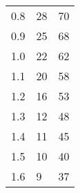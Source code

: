 \begin{table}[H]
{\begin{tabular}{|l|l|l|}
0.8                      & 28                                                                                                                  & 70                                                                                                                 \\
0.9                      & 25                                                                                                                  & 68                                                                                                                 \\
1.0                      & 22                                                                                                                  & 62                                                                                                                 \\
1.1                      & 20                                                                                                                  & 58                                                                                                                 \\
1.2                      & 16                                                                                                                  & 53                                                                                                                 \\
1.3                      & 12                                                                                                                  & 48                                                                                                                 \\
1.4                      & 11                                                                                                                  & 45                                                                                                                 \\
1.5                      & 10                                                                                                                  & 40                                                                                                                 \\
1.6                      & 9                                                                                                                   & 37                                                                                                                 \\

\end{tabular}}
\end{table}
